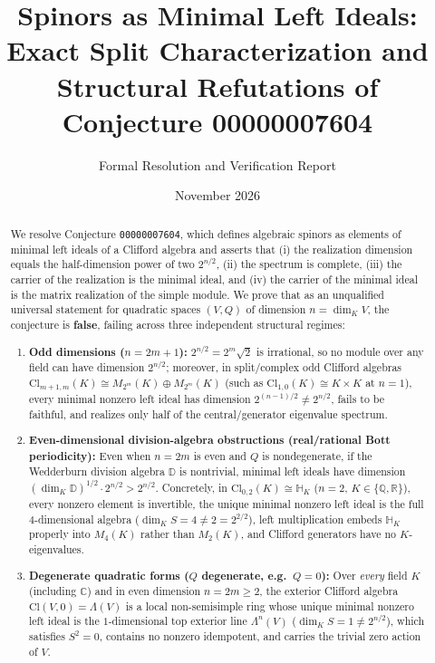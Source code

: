 \documentclass[11pt,a4paper]{article}
\title{\textbf{Spinors as Minimal Left Ideals: Exact Split Characterization and Structural Refutations of Conjecture 00000007604}}
\author{Formal Resolution and Verification Report}
\date{November 2026}
\theoremstyle{plain}
\theoremstyle{definition}
\theoremstyle{remark}
\newcommand{\Cl}{\mathrm{Cl}}
\begin{document}
\maketitle

\begin{abstract}
We resolve Conjecture \texttt{00000007604}, which defines algebraic spinors as elements of minimal left ideals of a Clifford algebra and asserts that (i) the realization dimension equals the half-dimension power of two $2^{n/2}$, (ii) the spectrum is complete, (iii) the carrier of the realization is the minimal ideal, and (iv) the carrier of the minimal ideal is the matrix realization of the simple module.
We prove that as an unqualified universal statement for quadratic spaces $(V, Q)$ of dimension $n = \dim_K V$, the conjecture is \textbf{false}, failing across three independent structural regimes:
\begin{enumerate}
  \item \textbf{Odd dimensions ($n = 2m + 1$):} $2^{n/2} = 2^m\sqrt{2}$ is irrational, so no module over any field can have dimension $2^{n/2}$; moreover, in split/complex odd Clifford algebras $\Cl_{m+1,m}(K) \cong M_{2^m}(K) \oplus M_{2^m}(K)$ (such as $\Cl_{1,0}(K) \cong K \times K$ at $n = 1$), every minimal nonzero left ideal has dimension $2^{(n-1)/2} \neq 2^{n/2}$, fails to be faithful, and realizes only half of the central/generator eigenvalue spectrum.
  \item \textbf{Even-dimensional division-algebra obstructions (real/rational Bott periodicity):} Even when $n = 2m$ is even and $Q$ is nondegenerate, if the Wedderburn division algebra $\mathbb{D}$ is nontrivial, minimal left ideals have dimension $(\dim_K \mathbb{D})^{1/2} \cdot 2^{n/2} > 2^{n/2}$. Concretely, in $\Cl_{0,2}(K) \cong \mathbb{H}_K$ ($n = 2$, $K \in \{\mathbb{Q}, \mathbb{R}\}$), every nonzero element is invertible, the unique minimal nonzero left ideal is the full $4$-dimensional algebra ($\dim_K S = 4 \neq 2 = 2^{2/2}$), left multiplication embeds $\mathbb{H}_K$ properly into $M_4(K)$ rather than $M_2(K)$, and Clifford generators have no $K$-eigenvalues.
  \item \textbf{Degenerate quadratic forms ($Q$ degenerate, e.g.\ $Q = 0$):} Over \emph{every} field $K$ (including $\mathbb{C}$) and in even dimension $n = 2m \ge 2$, the exterior Clifford algebra $\Cl(V, 0) = \Lambda(V)$ is a local non-semisimple ring whose unique minimal nonzero left ideal is the $1$-dimensional top exterior line $\Lambda^n(V)$ ($\dim_K S = 1 \neq 2^{n/2}$), which satisfies $S^2 = 0$, contains no nonzero idempotent, and carries the trivial zero action of $V$.

\end{enumerate}
\end{abstract}
\end{document}
